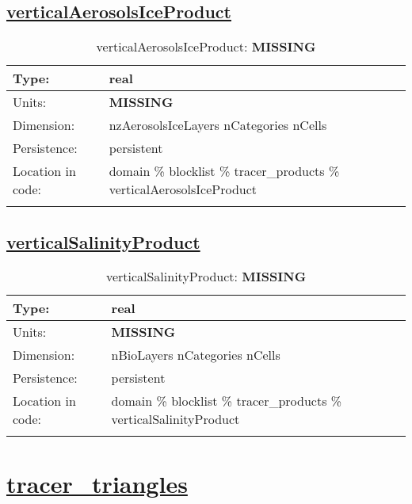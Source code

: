 \subsection[verticalAerosolsIceProduct]{\hyperref[sec:var_tab_tracer_products]{verticalAerosolsIceProduct}}
\label{subsec:var_sec_tracer_products_verticalAerosolsIceProduct}
\begin{center}
\begin{longtable}{| p{2.0in} | p{4.0in} |}
        \hline 
        Type: & real \\
        \hline 
        Units: & {\bf \color{red} MISSING} \\
        \hline 
        Dimension: & nzAerosolsIceLayers nCategories nCells \\
        \hline 
        Persistence: & persistent \\
        \hline 
         Location in code: & domain \% blocklist \% tracer\_products \% verticalAerosolsIceProduct \\
         \hline 
    \caption{verticalAerosolsIceProduct: {\bf \color{red} MISSING}}
\end{longtable}
\end{center}
\subsection[verticalSalinityProduct]{\hyperref[sec:var_tab_tracer_products]{verticalSalinityProduct}}
\label{subsec:var_sec_tracer_products_verticalSalinityProduct}
\begin{center}
\begin{longtable}{| p{2.0in} | p{4.0in} |}
        \hline 
        Type: & real \\
        \hline 
        Units: & {\bf \color{red} MISSING} \\
        \hline 
        Dimension: & nBioLayers nCategories nCells \\
        \hline 
        Persistence: & persistent \\
        \hline 
         Location in code: & domain \% blocklist \% tracer\_products \% verticalSalinityProduct \\
         \hline 
    \caption{verticalSalinityProduct: {\bf \color{red} MISSING}}
\end{longtable}
\end{center}
\section[tracer\_triangles]{\hyperref[sec:var_tab_tracer_triangles]{tracer\_triangles}}
\label{sec:var_sec_tracer_triangles}
